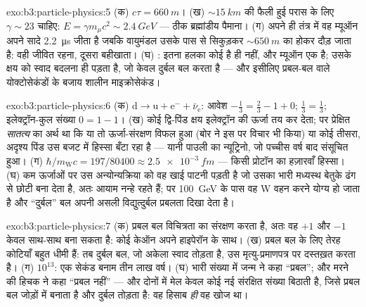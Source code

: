 \begin{solution}{exo:b3:particle-physics:5}
(क) $c\tau = \qty{660}{m}$। (ख) ${\sim}\qty{15}{km}$ की फैली हुई
परास के लिए $\gamma \sim 23$ चाहिए: $E = \gamma
m_\mu c^2 \sim \qty{2.4}{GeV}$ --- ठीक ब्रह्मांडीय पैमाना। (ग)
अपने ही तंत्र में वह म्यूऑन अपने सादे \qty{2.2}{\micro s} जीता है
जबकि वायुमंडल उसके पास से सिकुड़कर
${\sim}\qty{650}{m}$ का होकर दौड़ जाता है: वही जीवित रहना, दूसरा
बहीखाता। (घ) : इतना हलका कोई  है ही नहीं, और म्यूऑन एक
 है; उसके क्षय को स्वाद बदलना ही पड़ता है, जो केवल दुर्बल बल
करता है --- और इसीलिए प्रबल-बल वाले योक्टोसेकंडों के बजाय
शालीन माइक्रोसेकंड।
\end{solution}

\begin{solution}{exo:b3:particle-physics:6}
(क) $\text{d} \to \text{u} + \text{e}^- + \bar\nu_{\text{e}}$:
आवेश $-\tfrac13 = \tfrac23 - 1 + 0$; 
$\tfrac13 = \tfrac13$; इलेक्ट्रॉन-कुल संख्या $0 = 1 - 1$। (ख) कोई
द्वि-पिंड क्षय इलेक्ट्रॉन की ऊर्जा तय कर देता; पर प्रेक्षित
\emph{सातत्य} का अर्थ था कि या तो ऊर्जा-संरक्षण विफल हुआ
(बोर ने इस पर विचार भी किया) या कोई तीसरा, अदृश्य पिंड उस बजट में
हिस्सा बँटा रहा है --- यानी पाउली का न्यूट्रिनो, जो पच्चीस वर्ष बाद
संसूचित हुआ।
(ग) $\hbar/m_{\text{W}}c = 197/80400 \approx
\qty{2.5e-3}{fm}$ --- किसी प्रोटॉन का हज़ारवाँ हिस्सा। (घ) कम
ऊर्जाओं पर उस अन्योन्यक्रिया को वह खाई पाटनी पड़ती है जो उसका भारी
मध्यस्थ बेतुके ढंग से छोटी बना देता है, अतः आयाम नन्हे रहते हैं; पर
\qty{100}{GeV} के पास वह W वहन करने योग्य हो जाता है और ``दुर्बल''
बल अपनी असली विद्युत्दुर्बल प्रबलता दिखा देता है।
\end{solution}

\begin{solution}{exo:b3:particle-physics:7}
(क) प्रबल बल विचित्रता का संरक्षण करता है, अतः वह
$+1$ और $-1$ केवल साथ-साथ बना सकता है: कोई केऑन अपने हाइपेरॉन के
साथ। (ख) प्रबल बल के लिए तेरह
कोटियाँ बहुत धीमी हैं: तब दुर्बल
बल, जो अकेला स्वाद तोड़ता है, उस मृत्यु-प्रमाणपत्र पर दस्तख़त करता है।
(ग) $10^{13}$: एक सेकंड बनाम तीन लाख वर्ष।
(घ) भारी संख्या में जन्म ने कहा ``प्रबल''; और मरने की हिचक ने कहा
``प्रबल नहीं'' --- और दोनों में मेल केवल कोई नई संरक्षित संख्या
बिठाती है, जिसे प्रबल बल जोड़ों में बनाता है और दुर्बल तोड़ता है:
वह हिसाब \emph{ही} वह खोज था।
\end{solution}

